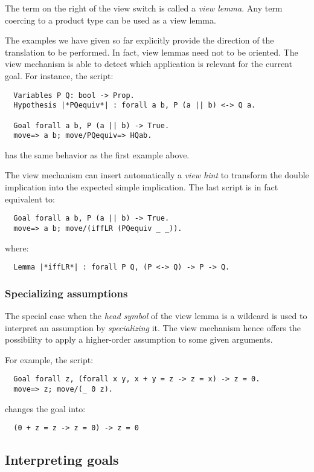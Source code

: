 The term on the right of the \C{/} view switch is called a \emph{view
  lemma}. Any \ssr{} term coercing to a product type can be used as a
view lemma.


The examples we have given so far explicitly provide the direction of the
translation to be performed. In fact, view lemmas need not to be
oriented. The view mechanism is able to detect which
application is relevant for the current goal. For instance, the
script:
\begin{lstlisting}
  Variables P Q: bool -> Prop.
  Hypothesis |*PQequiv*| : forall a b, P (a || b) <-> Q a.

  Goal forall a b, P (a || b) -> True.
  move=> a b; move/PQequiv=> HQab.
\end{lstlisting}
has the same behavior as the first example above.

The view mechanism can insert automatically a \emph{view hint} to
transform the double implication into the expected simple implication.
The last script is in fact equivalent to:
\begin{lstlisting}
  Goal forall a b, P (a || b) -> True.
  move=> a b; move/(iffLR (PQequiv _ _)).
\end{lstlisting}
where:
\begin{lstlisting}
  Lemma |*iffLR*| : forall P Q, (P <-> Q) -> P -> Q.
\end{lstlisting}


\subsubsection*{Specializing assumptions}
The special case when the \emph{head symbol} of the view lemma is a
wildcard is used to interpret an assumption by \emph{specializing}
it. The view mechanism hence offers the possibility to
apply a higher-order assumption to some given arguments.

For example, the script:
\begin{lstlisting}
  Goal forall z, (forall x y, x + y = z -> z = x) -> z = 0.
  move=> z; move/(_ 0 z).
\end{lstlisting}
changes the goal into:
\begin{lstlisting}
  (0 + z = z -> z = 0) -> z = 0
\end{lstlisting}




\subsection{Interpreting goals}\label{ssec:goalinterp}

